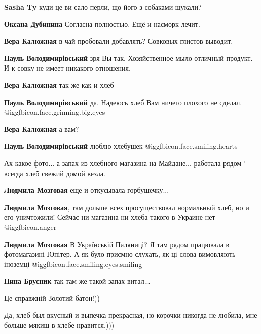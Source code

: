 \begin{itemize}
\begin{itemize}
\begin{itemize}
\textbf{Sasha Ty} куди це ви сало перли, що його з собаками шукали?

\textbf{Оксана Дубинина} Согласна полностью.
Ещё и насморк лечит.🥰

\textbf{Вера Калюжная} в чай пробовали добавлять? Совковых глистов выводит.

\textbf{Пауль Володимирівський} зря Вы так.
Хозяйственное мыло отличный продукт.
И к совку не имеет никакого отношения.

\textbf{Вера Калюжная} так же как и хлеб

\textbf{Пауль Володимирівський} да.
Надеюсь хлеб Вам ничего плохого не сделал.  @igg{fbicon.face.grinning.big.eyes} 

\textbf{Вера Калюжная} а вам?

\textbf{Пауль Володимирівський} люблю хлебушек  @igg{fbicon.face.smiling.hearts} 
\end{itemize} %

\end{itemize} %


Ах какое фото... а запах из хлебного магазина на Майдане... работала рядом '-
всегда хлеб свежий домой везла.

\begin{itemize} %
\textbf{Людмила Мозговая} еще и откусывала горбушечку...

\textbf{Людмила Мозговая}, там дольше всех просуществовал нормальный хлеб, но и его уничтожили! Сейчас ни магазина ни хлеба такого в Украине нет @igg{fbicon.anger} 

\textbf{Людмила Мозговая} В Українській Паляниці? Я там рядом працювала в фотомагазині Юпітер. А як було приємно слухать, як ці слова вимовляють іноземці @igg{fbicon.face.smiling.eyes.smiling} 

\textbf{Нина Брусник} так там же такой запах витал...
\end{itemize} %

Це справжній Золотий батон!))

Да, хлеб был вкусный и выпечка прекрасная, но корочки никогда не любила, мне
больше мякиш в хлебе нравится.)))


\end{itemize}
